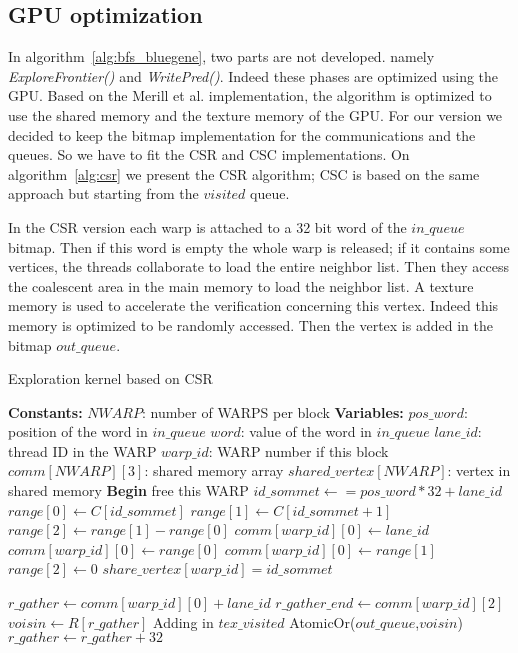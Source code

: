 \subsection{GPU optimization}

In algorithm~\ref{alg:bfs_bluegene}, two parts are not developed. namely \textit{ExploreFrontier()} and \textit{WritePred()}. Indeed these phases are optimized using the GPU. 
Based on the Merill et al. implementation, the algorithm is optimized to use the shared memory and the texture memory of the GPU. 
For our version we decided to keep the bitmap implementation for the communications and the queues. So we have to fit the CSR and CSC implementations. 
On algorithm~\ref{alg:csr} we present the CSR algorithm;
CSC is based on the same approach but starting from the $visited$ queue. 

In the CSR version each warp is attached to a 32 bit word of the $in\_queue$ bitmap. 
Then if this word is empty the whole warp is released; 
if it contains some vertices, the threads collaborate to load the entire neighbor list. 
Then they access the coalescent area in the main memory to load the neighbor list. 
A texture memory is used to accelerate the verification concerning this vertex. Indeed this memory is optimized to be randomly accessed. 
Then the vertex is added in the bitmap $out\_queue$.

\begin{algorithm}
\caption{Exploration kernel based on CSR}\label{alg:csr}
\begin{algorithmic}[1]
\State \textbf{Constants:}
\State $NWARP$: number of WARPS per block
\State 
\State \textbf{Variables:}
\State $pos\_word$: position of the word in $in\_queue$
\State $word$: value of the word in $in\_queue$
\State $lane\_id$: thread ID in the WARP
\State $warp\_id$: WARP number if this block
\State $comm[NWARP][3]$: shared memory array
\State $shared\_vertex[NWARP]$: vertex in shared memory
\State 
\State \textbf{Begin}
\State free this WARP
\EndIf
{}
\State $id\_sommet \gets = pos\_word*32+lane\_id$
\State $range[0] \gets C[id\_sommet]$ 
\State $range[1] \gets C[id\_sommet +1 ]$ 
\State $range[2] \gets range[1] - range[0]$ 
\EndIf
{}
\State $comm[warp\_id][0] \gets lane\_id$
\EndIf
{}
\State $comm[warp\_id][0] \gets range[0]$
\State $comm[warp\_id][0] \gets range[1]$
\State $range[2] \gets 0$
\State $share\_vertex[warp\_id] = id\_sommet$ 
\EndIf

\State $r\_gather \gets comm[warp\_id][0] + lane\_id$
\State $r\_gather\_end \gets comm[warp\_id][2] $
	\State $voisin \gets R[r\_gather]$
		\State Adding in $tex\_visited$
		\State AtomicOr($out\_queue$,$voisin$)
	\EndIf
	\State $r\_gather \gets r\_gather + 32$
\EndWhile
\EndWhile
\end{algorithmic}
\end{algorithm}

